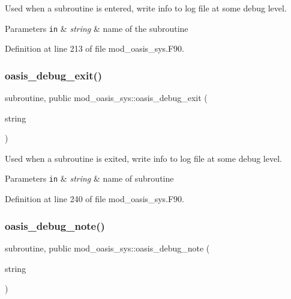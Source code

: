 Used when a subroutine is entered, write info to log file at some debug level. 


\begin{DoxyParams}[1]{Parameters}
\mbox{\tt in}  & {\em string} & name of the subroutine \\
\hline
\end{DoxyParams}


Definition at line 213 of file mod\+\_\+oasis\+\_\+sys.\+F90.

\mbox{\label{namespacemod__oasis__sys_a349f71cba2df935179d78f3858992c83}} 
\subsubsection{\texorpdfstring{oasis\+\_\+debug\+\_\+exit()}{oasis\_debug\_exit()}}
{\footnotesize\ttfamily subroutine, public mod\+\_\+oasis\+\_\+sys\+::oasis\+\_\+debug\+\_\+exit (\begin{DoxyParamCaption}\item[{character(len=$\ast$), intent(in)}]{string }\end{DoxyParamCaption})}



Used when a subroutine is exited, write info to log file at some debug level. 


\begin{DoxyParams}[1]{Parameters}
\mbox{\tt in}  & {\em string} & name of subroutine \\
\hline
\end{DoxyParams}


Definition at line 240 of file mod\+\_\+oasis\+\_\+sys.\+F90.

\mbox{\label{namespacemod__oasis__sys_a8e488f6a9a829762324519c6dd493912}} 
\subsubsection{\texorpdfstring{oasis\+\_\+debug\+\_\+note()}{oasis\_debug\_note()}}
{\footnotesize\ttfamily subroutine, public mod\+\_\+oasis\+\_\+sys\+::oasis\+\_\+debug\+\_\+note (\begin{DoxyParamCaption}\item[{character(len=$\ast$), intent(in)}]{string }\end{DoxyParamCaption})}



